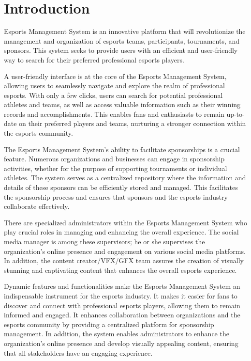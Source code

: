 \chapter{Introduction}
\hrulefill

Esports Management System is an innovative platform that will revolutionize the management and organization of esports teams, participants, tournaments, and sponsors. This system seeks to provide users with an efficient and user-friendly way to search for their preferred professional esports players.

A user-friendly interface is at the core of the Esports Management System, allowing users to seamlessly navigate and explore the realm of professional esports. With only a few clicks, users can search for potential professional athletes and teams, as well as access valuable information such as their winning records and accomplishments. This enables fans and enthusiasts to remain up-to-date on their preferred players and teams, nurturing a stronger connection within the esports community.

The Esports Management System's ability to facilitate sponsorships is a crucial feature. Numerous organizations and businesses can engage in sponsorship activities, whether for the purpose of supporting tournaments or individual athletes. The system serves as a centralized repository where the information and details of these sponsors can be efficiently stored and managed. This facilitates the sponsorship process and ensures that sponsors and the esports industry collaborate effectively.

There are specialized administrators within the Esports Management System who play crucial roles in managing and enhancing the overall experience. The social media manager is among these supervisors; he or she supervises the organization's online presence and engagement on various social media platforms. In addition, the content creator/VFX/GFX team assures the creation of visually stunning and captivating content that enhances the overall esports experience.

Dynamic features and functionalities make the Esports Management System an indispensable instrument for the esports industry. It makes it easier for fans to discover and connect with professional esports players, allowing them to remain informed and engaged. It enhances collaboration between organizations and the esports community by providing a centralized platform for sponsorship management. In addition, the system enables administrators to enhance the organization's online presence and develop visually appealing content, ensuring that all stakeholders have an engaging experience.

